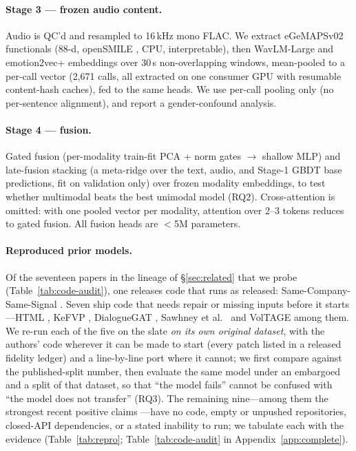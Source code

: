 \paragraph{Stage 3 --- frozen audio content.}
Audio is QC'd and resampled to 16\,kHz mono FLAC. We extract eGeMAPSv02 functionals
(88-d, openSMILE \citep{opensmile}, CPU, interpretable), then WavLM-Large
\citep{wavlm} and emotion2vec+ \citep{emotion2vec} embeddings over 30\,s
non-overlapping windows, mean-pooled to a per-call vector (2{,}671 calls, all
extracted on one consumer GPU with resumable content-hash caches), fed to the same
heads. We use per-call pooling only (no per-sentence alignment), and report a
gender-confound analysis.

\paragraph{Stage 4 --- fusion.}
Gated fusion (per-modality train-fit PCA + norm gates $\to$ shallow MLP) and
late-fusion stacking (a meta-ridge over the text, audio, and Stage-1 GBDT base
predictions, fit on validation only) over frozen modality embeddings, to test
whether multimodal beats the best unimodal model (RQ2). Cross-attention is omitted:
with one pooled vector per modality, attention over 2--3 tokens reduces to gated
fusion. All fusion heads are $<$5M parameters.

\paragraph{Reproduced prior models.}
\label{sec:repro-protocol}
Of the seventeen papers in the lineage of \S\ref{sec:related} that we probe
(Table~\ref{tab:code-audit}), one releases code that runs as released:
Same-Company-Same-Signal \citep{scss2024}. Seven ship code that needs repair or
missing inputs before it starts---HTML \citep{yang2020html}, KeFVP
\citep{niu2023kefvp}, DialogueGAT \citep{sang2022dialoguegat}, Sawhney et al.\
\citeyearpar{sawhney2020mm} and VolTAGE \citep{sawhney2020voltage} among them. We
re-run each of the five on the slate \emph{on its own original dataset}, with the
authors' code wherever it can be made to start (every patch listed in a released
fidelity ledger) and a line-by-line port where it cannot; we first compare against
the published-split number, then evaluate the same model under an embargoed and a
\tickerdisjoint{} split of that dataset, so that ``the model fails'' cannot be
confused with ``the model does not transfer'' (RQ3). The remaining nine---among them
the strongest recent positive claims
\citep{cao2024ecc,soundofrisk2025}---have no code, empty or unpushed repositories,
closed-API dependencies, or a stated inability to run; we tabulate
each with the evidence (Table~\ref{tab:repro}; Table~\ref{tab:code-audit} in
Appendix~\ref{app:complete}).
